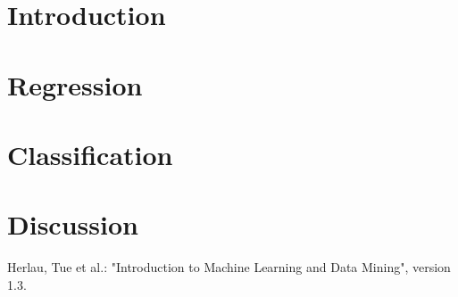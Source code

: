 \documentclass[11pt,fleqn]{article}
\numberwithin{footnote}{section}
\numberwithin{figure}{section}
\numberwithin{table}{section}
\begin{document}
\clearpage
\setcounter{page}{1}
\section{Introduction}


\section{Regression}


\section{Classification}


\section{Discussion}


\begin{thebibliography}{9}
	 Herlau, Tue et al.: "Introduction to Machine Learning and Data Mining", version 1.3.
\end{thebibliography}
\end{document}
